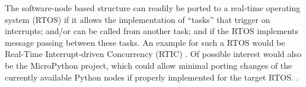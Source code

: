 The software-node based structure can readily be ported to a real-time
operating system (RTOS) if it allows the implementation of ``tasks''
that trigger on interrupts; and/or can be called from another task; and
if the RTOS implements message passing between these tasks. An example
for such a RTOS would be Real-Time Interrupt-driven Concurrency (RTIC)
\parencite{rtic}. Of possible interest would also be the MicroPython
project, which could allow minimal porting changes of the currently
available Python nodes if properly implemented for the target RTOS.
\parencite{micropython}.
